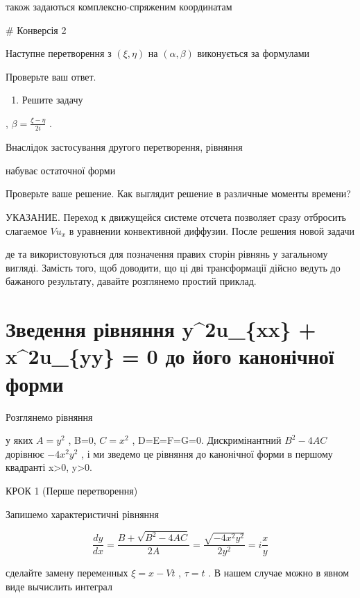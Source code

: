 \documentclass[
  ukrainian,
]{article}
\providecommand{\tightlist}{%
  \setlength{\itemsep}{0pt}\setlength{\parskip}{0pt}}
\begin{document}
також задаються комплексно-спряженим координатам

\# Конверсія 2

Наступне перетворення з \((\xi,\eta)\) на \((\alpha,\beta)\) виконується
за формулами

Проверьте ваш ответ.

\begin{enumerate}
\def\labelenumi{\arabic{enumi}.}
\setcounter{enumi}{3}
\tightlist
\item
  Решите задачу
\end{enumerate}

, \(\beta = \frac{\xi - \eta}{2i}\) .

Внаслідок застосування другого перетворення, рівняння

набуває остаточної форми

Проверьте ваше решение. Как выглядит решение в различные моменты
времени?

УКАЗАНИЕ. Переход к движущейся системе отсчета позволяет сразу отбросить
слагаемое \(Vu_x\) в уравнении конвективной диффузии. После решения
новой задачи

де \phi та \phi використовуються для позначення правих сторін рівнянь у
загальному вигляді. Замість того, щоб доводити, що ці дві трансформації
дійсно ведуть до бажаного результату, давайте розглянемо простий
приклад.

\section{Зведення рівняння y\^{}2u\_\{xx\} + x\^{}2u\_\{yy\} = 0 до його
канонічної
форми}\label{ux437ux432ux435ux434ux435ux43dux43dux44f-ux440ux456ux432ux43dux44fux43dux43dux44f-y2u_xx-x2u_yy-0-ux434ux43e-ux439ux43eux433ux43e-ux43aux430ux43dux43eux43dux456ux447ux43dux43eux457-ux444ux43eux440ux43cux438}

Розглянемо рівняння

у яких \(A=y^2\) , B=0, \(C=x^2\) , D=E=F=G=0. Дискримінантний
\(B^2-4AC\) дорівнює \(-4x^2y^2\) , і ми зведемо це рівняння до
канонічної форми в першому квадранті x\textgreater0, y\textgreater0.

КРОК 1 (Перше перетворення)

Запишемо характеристичні рівняння

\[
\frac{dy}{dx} = \frac{B + \sqrt{B^2 - 4AC}}{2A} = \frac{\sqrt{-4x^2y^2}}{2y^2} = i\frac{x}{y}
\]

сделайте замену переменных \(\xi = x - Vt\) , \(\tau = t\) . В нашем
случае можно в явном виде вычислить интеграл
\end{document}

